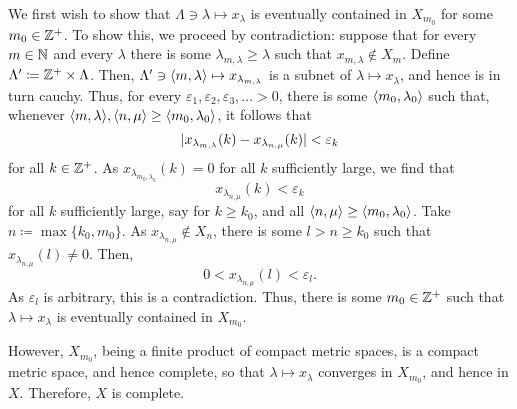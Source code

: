 \begin{exm}
\begin{savenotes}
We first wish to show that $\Lambda \ni \lambda \mapsto x_\lambda$ is eventually contained in $X_{m_0}$ for some $m_0\in \mathbb{Z} ^+$.  To show this, we proceed by contradiction:  suppose that for every $m\in \mathbb{N}$ and every $\lambda$ there is some $\lambda _{m,\lambda}\geq \lambda$ such that $x_{m,\lambda}\notin X_m$.  Define $\Lambda '\coloneqq \mathbb{Z} ^+\times \Lambda$.  Then, $\Lambda '\ni \langle m,\lambda\rangle\mapsto x_{\lambda _{m,\lambda}}$ is a subnet of $\lambda \mapsto x_\lambda$, and hence is in turn cauchy.  Thus, for every $\varepsilon _1,\varepsilon _2,\varepsilon _3,\ldots >0$, there is some $\langle m_0,\lambda _0\rangle$ such that, whenever $\langle m,\lambda\rangle,\langle n,\mu\rangle\geq \langle m_0,\lambda _0\rangle$, it follows that
\begin{equation}
\lvert x_{\lambda _{m,\lambda}}(k)-x_{\lambda _{n,\mu}}(k)\rvert<\varepsilon _k
\end{equation}
for all $k\in \mathbb{Z} ^+$.  As $x_{\lambda _{m_0,\lambda _0}}(k)=0$ for all $k$ sufficiently large, we find that
\begin{equation}
x_{\lambda _{n,\mu}}(k)<\varepsilon _k
\end{equation}
for all $k$ sufficiently large, say for $k\geq k_0$, and all $\langle n,\mu\rangle\geq \langle m_0,\lambda _0\rangle$.  Take $n\coloneqq \max \{ k_0,m_0\}$.  As $x_{\lambda _{n,\mu}}\notin X_n$, there is some $l>n\geq k_0$ such that $x_{\lambda _{n,\mu}}(l)\neq 0$.  Then,
\begin{equation}
0<x_{\lambda _{n,\mu}}(l)<\varepsilon _l.
\end{equation}
As $\varepsilon _l$ is arbitrary, this is a contradiction.  Thus, there is some $m_0\in \mathbb{Z} ^+$ such that $\lambda \mapsto x_\lambda$ is eventually contained in $X_{m_0}$.

However, $X_{m_0}$, being a finite product of compact metric spaces, is a compact metric space, and hence complete, so that $\lambda \mapsto x_\lambda$ converges in $X_{m_0}$, and hence in $X$.  Therefore, $X$ is complete.


\end{savenotes}
\end{exm}
